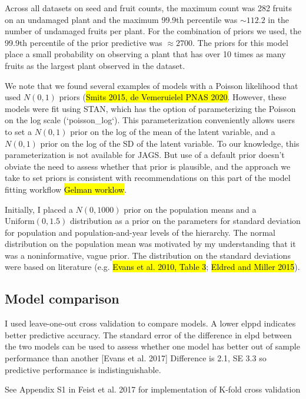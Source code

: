 \documentclass[12pt, oneside, titlepage]{article}   	%
\begin{document}
Across all datasets on seed and fruit counts, the maximum count was 282 fruits on an undamaged plant and the maximum 99.9th percentile was $\sim112.2$ in the number of undamaged fruits per plant. For the combination of priors we used, the 99.9th percentile of the prior predictive was $\approx 2700$. The priors for this model place a small probability on observing a plant that has over 10 times as many fruits as the largest plant observed in the dataset. 

We note that we found several examples of models with a Poisson likelihood that used $N(0,1)$ priors (\hl{Smits 2015, de Vemeruielel PNAS 2020}. However, these models were fit using STAN, which has the option of parameterizing the Poisson on the log scale (`poisson\_log`). This parameterization conveniently allows users to set a $N(0,1)$ prior on the log of the mean of the latent variable, and a $N(0,1)$ prior on the log of the SD of the latent variable. To our knowledge, this parameterization is not available for JAGS. But use of a default prior doesn't obviate the need to assess whether that prior is plausible, and the approach we take to set priors is consistent with recommendations on this part of the model fitting workflow \hl{Gelman worklow}.

Initially, I placed a $N(0,1000)$ prior on the population means and a $\mathrm{Uniform}(0,1.5)$ distribution as a prior on the parameters for standard deviation for population and population-and-year levels of the hierarchy. The normal distribution on the population mean was motivated by my understanding that it was a noninformative, vague prior. The distribution on the standard deviations were based on literature (e.g. \hl{Evans et al. 2010, Table 3}; \hl{Eldred and Miller 2015}). 


\subsection*{Model comparison}

I used leave-one-out cross validation to compare models. A lower elppd indicates better predictive accuracy. The standard error of the difference in elpd between the two models can be used to assess whether one model has better out of sample performance than another [Evans et al. 2017] Difference is 2.1, SE 3.3 so predictive performance is indistinguishable.

See Appendix S1 in Feist et al. 2017 for implementation of K-fold cross validation


%
\end{document}
